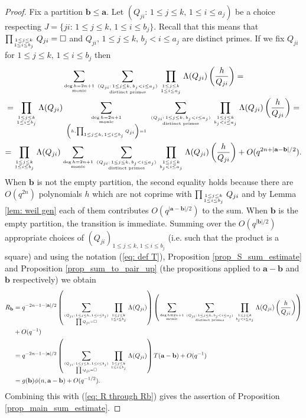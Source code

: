 \documentclass[alphabetic, 
        colorlinks,
        linkcolor=red,  citecolor=blue,
        backref
]{amsart}
\numberwithin{equation}{section}
\theoremstyle{definition}
\begin{document}
\begin{proof}
Fix a partition $\mathbf b\le \mathbf a$. Let $(Q_{ji}:\,1\le j\le k,\,1\le i\le a_j)$ be a choice respecting $J=\{ji:\,1\le j\le k,\,1\le i\le b_j\}.$ Recall that this means that $\prod_{1\le j\le k\atop{1\le i\le b_j}}Q_{ji}=\square$ and $Q_{ji},\,1\le j\le k,\,b_j< i\le a_j$ are distinct primes. If we fix $Q_{ji}$ for $1\le j\le k,\,1\le i\le b_j$ then 
\begin{multline*}
\sum_{\deg h=2n+1\atop{\text{monic}}}\sum_{(Q_{ji}:\,1\le j\le k,\,b_j<i\le a_j)\atop{\text{distinct primes}}}\prod_{1\le j\le k\atop{1\le i\le a_j}}\Lambda(Q_{ji})\left(\frac{h}{Q_{ji}}\right)=
\\=\prod_{1\le j\le k\atop{1\le i\le b_j}}\Lambda(Q_{ji})\sum_{\deg h=2n+1\atop{\text{monic}\atop{\left(h,\prod_{1\le j\le k,\,1\le i\le b_j} Q_{ji}\right)=1}}}\sum_{(Q_{ji}:\,1\le j\le k,\,b_j<i\le a_j)\atop{\text{distinct primes}}}
\prod_{1\le j\le k\atop{b_j<i\le a_j}}\Lambda(Q_{ji})\left(\frac{h}{Q_{ji}}\right)=\\
=\prod_{1\le j\le k\atop{1\le i\le b_j}}\Lambda(Q_{ji})\sum_{\deg h=2n+1\atop{\text{monic}}}\sum_{(Q_{ji}:\,1\le j\le k,\, b_j<i\le a_j)\atop{\text{distinct primes}}}\prod_{1\le j\le k\atop{b_j<i\le a_j}}\Lambda(Q_{ji})\left(\frac{h}{Q_{ji}}\right)+O(q^{2n+|\mathbf a-\mathbf b|/2}).
\end{multline*}
When $\mathbf b$ is not the empty partition, the second equality holds because there are $O(q^{2n})$ polynomials $h$ which are not coprime with $\prod_{1\le j\le k\atop{1\le i\le b_j}}Q_{ji}$ and by Lemma \ref{lem: weil gen} each of them contributes $O(q^{|\mathbf a-\mathbf b|/2})$ to the sum. When $\mathbf b$ is the empty partition, the transition is immediate. Summing over the $O(q^{|\mathbf b|/2})$ appropriate choices of $(Q_{ji})_{1\le j\le k,\,1\le i\le b_j}$ (i.e. such that the product is a square) and using the notation (\ref{eq: def T}), Proposition \ref{prop_S_sum_estimate} and Proposition \ref{prop_sum_to_pair_up} (the propositions applied to $\mathbf a-\mathbf b$ and $\mathbf b$ respectively) we obtain
\begin{align*}
R_{\mathbf b}&=q^{-2n-1-|\mathbf a|/2}\left(\sum_{(Q_{ji}:\,1\le j\le k,\,1\le i\le b_j)\atop\prod Q_{ji}=\square}\prod_{1\le j\le k\atop{1\le i\le b_j}}\Lambda(Q_{ji})\right)\left(\sum_{\deg h=2n+1\atop{\text{monic}}}\sum_{(Q_{ji}:\,1\le j\le k,\,b_j<i\le a_j)\atop{\text{distinct primes}}}\prod_{1\le j\le k\atop{b_j<i\le a_j}}\Lambda(Q_{ji})\left(\frac{h}{Q_{ji}}\right)\right)\\&+O(q^{-1})
\\&=
q^{-2n-1-|\mathbf a|/2}\left(\sum_{(Q_{ji}:\,1\le j\le k,\,1\le i\le b_j)\atop\prod {Q_{ji}}=\square}\prod_{1\le j\le k\atop{1\le i\le b_j}}\Lambda(Q_{ji})\right)T(\mathbf a-\mathbf b)+O(q^{-1})
\\&=g(\mathbf b)\phi(n,\mathbf a-\mathbf b)+O(q^{-1/2}).\end{align*}
Combining this with (\ref{eq: R through Rb}) gives the assertion of Proposition \ref{prop_main_sum_estimate}.\end{proof}
\end{document}
